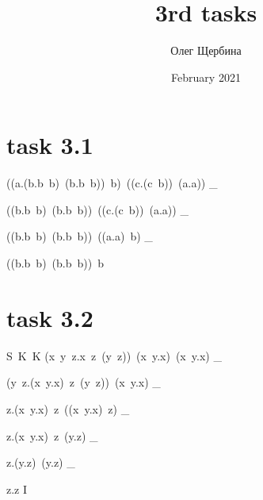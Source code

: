 \documentclass{article}
\title{3rd tasks}
\author{Олег Щербина}
\date{February 2021}
\begin{document}
\section*{task 3.1}

((\lambda a.(\lambda b.b\ b)\ (\lambda b.b\ b))\ b)\ ((\lambda c.(c\ b))\ (\lambda a.a)) \rightarrow_\beta

((\lambda b.b\ b)\ (\lambda b.b\ b))\ ((\lambda c.(c\ b))\ (\lambda a.a)) \rightarrow_\beta

((\lambda b.b\ b)\ (\lambda b.b\ b))\ ((\lambda a.a)\ b) \rightarrow_\beta

((\lambda b.b\ b)\ (\lambda b.b\ b))\ b$$

\section*{task 3.2}

S\ K\ K \equiv (\lambda x\ y\ z.x\ z\ (y\ z))\ (\lambda x\ y.x)\ (\lambda x\ y.x) \rightarrow_\beta

(\lambda y\ z.(\lambda x\ y.x)\ z\ (y\ z))\ (\lambda x\ y.x) \rightarrow_\beta

\lambda z.(\lambda x\ y.x)\ z\ ((\lambda x\ y.x)\ z) \rightarrow_\beta 

\lambda z.(\lambda x\ y.x)\ z\ (\lambda y.z) \rightarrow_\beta

\lambda z.(\lambda y.z)\ (\lambda y.z) \rightarrow_\beta

\lambda z.z \equiv I
\end{document}
